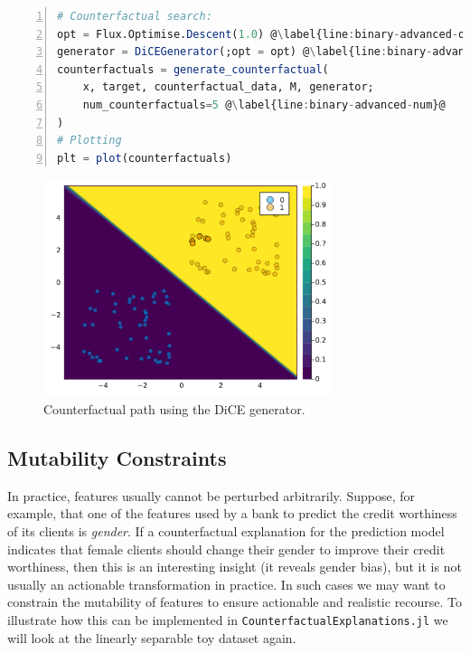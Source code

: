 \documentclass{juliacon}
\begin{document}
\begin{lstlisting}[language=Julia, escapechar=@, numbers=left, label={lst:binary-advanced}, caption={An advanced usage example involving the DiCE Generator.}]
# Counterfactual search:
opt = Flux.Optimise.Descent(1.0) @\label{line:binary-advanced-opt}@
generator = DiCEGenerator(;opt = opt) @\label{line:binary-advanced-dice}@
counterfactuals = generate_counterfactual(
    x, target, counterfactual_data, M, generator;
    num_counterfactuals=5 @\label{line:binary-advanced-num}@
)
# Plotting
plt = plot(counterfactuals)
\end{lstlisting}

\begin{figure}

{\centering \includegraphics[width=3.33333in,height=2.5in]{www/binary_advanced.png}

}

\caption{\label{fig-binary-advanced}Counterfactual path using the DiCE
generator.}

\end{figure}

\hypertarget{mutability-constraints}{%
\subsection{Mutability Constraints}\label{mutability-constraints}}

In practice, features usually cannot be perturbed arbitrarily. Suppose,
for example, that one of the features used by a bank to predict the
credit worthiness of its clients is \emph{gender}. If a counterfactual
explanation for the prediction model indicates that female clients
should change their gender to improve their credit worthiness, then this
is an interesting insight (it reveals gender bias), but it is not
usually an actionable transformation in practice. In such cases we may
want to constrain the mutability of features to ensure actionable and
realistic recourse. To illustrate how this can be implemented in
\texttt{CounterfactualExplanations.jl} we will look at the linearly
separable toy dataset again.
\end{document}
